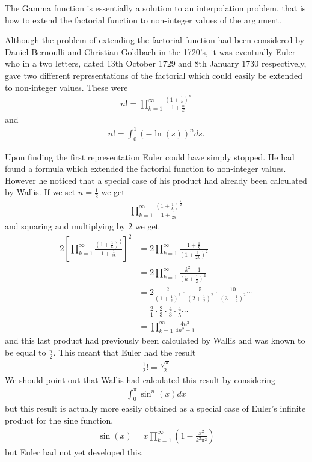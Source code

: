 The Gamma function is essentially a solution to an interpolation problem, that is how to extend the factorial function to non-integer values of the argument. 



Although the problem of extending the factorial function had been considered by Daniel Bernoulli and Christian Goldbach in the 1720’s, it was eventually Euler who in a two letters, dated 13th October 1729 and 8th January 1730 respectively, gave two different representations of the factorial which could easily be extended to non-integer values. These were
\begin{align}
    \label{eq:euler_prod}
    n! = \prod_{k=1}^\infty \frac{\left(1+\frac{1}{k}\right)^n}{1 + \frac{n}{k}}
\end{align}
and
\begin{align}
    \label{eq:euler_log}
    n! = \int_0^1 (-\ln(s))^n ds.
\end{align}

Upon finding the first representation Euler could have simply stopped. He had found a formula which extended the factorial function to non-integer values. However he noticed that a special case of his product had already been calculated by Wallis. If we set $ n = \frac{1}{2} $ we get
\begin{align}
    \prod_{k=1}^\infty \frac{(1 + \frac{1}{k})^\frac{1}{2}}{1 + \frac{1}{2k}}
\end{align}
and squaring and multiplying by $ 2 $ we get
\begin{align}
    2 \left[ \prod_{k=1}^\infty \frac{(1 + \frac{1}{k})^\frac{1}{2}}{1 + \frac{1}{2k}}\right]^2 &= 2\prod_{k=1}^\infty \frac{1+\frac{1}{k}}{(1+\frac{1}{2k})^2} \\
    &= 2 \prod^\infty_{k=1} \frac{k^2+1}{(k + \frac{1}{2})^2} \\
    &= 2 \frac{2}{(1+\frac{1}{2})^2} \cdot \frac{5}{(2 + \frac{1}{2})^2} \cdot \frac{10}{(3+\frac{1}{2})^2}\cdots \\
    &= \frac{2}{1}\cdot\frac{2}{3}\cdot\frac{4}{3}\cdot\frac{4}{5}\cdots \\
    &= \prod_{k=1}^{\infty} \frac{4n^2}{4n^2-1}
\end{align}
and this last product had previously been calculated by Wallis and was known to be equal to $ \frac{\pi}{2} $. This meant that Euler had the result 
\begin{align}
    \frac{1}{2} ! = \frac{\sqrt{\pi}}{2}
\end{align}
We should point out that Wallis had calculated this result by considering 
\begin{align}
    \int_0^\pi \sin^n(x) dx
\end{align}
but this result is actually more easily obtained as a special case of Euler's infinite product for the sine function,
\begin{align}
    \sin(x) = x\prod_{k=1}^\infty \left( 1 - \frac{x^2}{k^2\pi^2} \right)
\end{align}
but Euler had not yet developed this.

